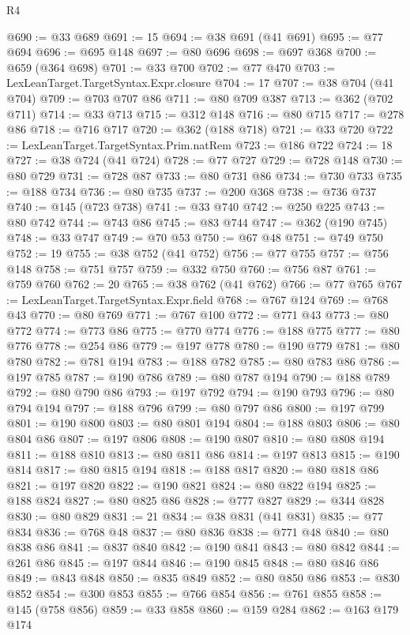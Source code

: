 \begin{lexlean}{R4}
\begin{coremodule}
@690 := @33 @689
@691 := 15
@694 := @38 @691 (@41 @691)
@695 := @77 @694
@696 := @695 @148
@697 := @80 @696
@698 := @697 @368
@700 := @659 (@364 @698)
@701 := @33 @700
@702 := @77 @470
@703 := LexLeanTarget.TargetSyntax.Expr.closure
@704 := 17
@707 := @38 @704 (@41 @704)
@709 := @703 @707 @86
@711 := @80 @709 @387
@713 := @362 (@702 @711)
@714 := @33 @713
@715 := @312 @148
@716 := @80 @715
@717 := @278 @86
@718 := @716 @717
@720 := @362 (@188 @718)
@721 := @33 @720
@722 := LexLeanTarget.TargetSyntax.Prim.natRem
@723 := @186 @722
@724 := 18
@727 := @38 @724 (@41 @724)
@728 := @77 @727
@729 := @728 @148
@730 := @80 @729
@731 := @728 @87
@733 := @80 @731 @86
@734 := @730 @733
@735 := @188 @734
@736 := @80 @735
@737 := @200 @368
@738 := @736 @737
@740 := @145 (@723 @738)
@741 := @33 @740
@742 := @250 @225
@743 := @80 @742
@744 := @743 @86
@745 := @83 @744
@747 := @362 (@190 @745)
@748 := @33 @747
@749 := @70 @53
@750 := @67 @48
@751 := @749 @750
@752 := 19
@755 := @38 @752 (@41 @752)
@756 := @77 @755
@757 := @756 @148
@758 := @751 @757
@759 := @332 @750
@760 := @756 @87
@761 := @759 @760
@762 := 20
@765 := @38 @762 (@41 @762)
@766 := @77 @765
@767 := LexLeanTarget.TargetSyntax.Expr.field
@768 := @767 @124
@769 := @768 @43
@770 := @80 @769
@771 := @767 @100
@772 := @771 @43
@773 := @80 @772
@774 := @773 @86
@775 := @770 @774
@776 := @188 @775
@777 := @80 @776
@778 := @254 @86
@779 := @197 @778
@780 := @190 @779
@781 := @80 @780
@782 := @781 @194
@783 := @188 @782
@785 := @80 @783 @86
@786 := @197 @785
@787 := @190 @786
@789 := @80 @787 @194
@790 := @188 @789
@792 := @80 @790 @86
@793 := @197 @792
@794 := @190 @793
@796 := @80 @794 @194
@797 := @188 @796
@799 := @80 @797 @86
@800 := @197 @799
@801 := @190 @800
@803 := @80 @801 @194
@804 := @188 @803
@806 := @80 @804 @86
@807 := @197 @806
@808 := @190 @807
@810 := @80 @808 @194
@811 := @188 @810
@813 := @80 @811 @86
@814 := @197 @813
@815 := @190 @814
@817 := @80 @815 @194
@818 := @188 @817
@820 := @80 @818 @86
@821 := @197 @820
@822 := @190 @821
@824 := @80 @822 @194
@825 := @188 @824
@827 := @80 @825 @86
@828 := @777 @827
@829 := @344 @828
@830 := @80 @829
@831 := 21
@834 := @38 @831 (@41 @831)
@835 := @77 @834
@836 := @768 @48
@837 := @80 @836
@838 := @771 @48
@840 := @80 @838 @86
@841 := @837 @840
@842 := @190 @841
@843 := @80 @842
@844 := @261 @86
@845 := @197 @844
@846 := @190 @845
@848 := @80 @846 @86
@849 := @843 @848
@850 := @835 @849
@852 := @80 @850 @86
@853 := @830 @852
@854 := @300 @853
@855 := @766 @854
@856 := @761 @855
@858 := @145 (@758 @856)
@859 := @33 @858
@860 := @159 @284
@862 := @163 @179 @174

\end{coremodule}
\end{lexlean}
